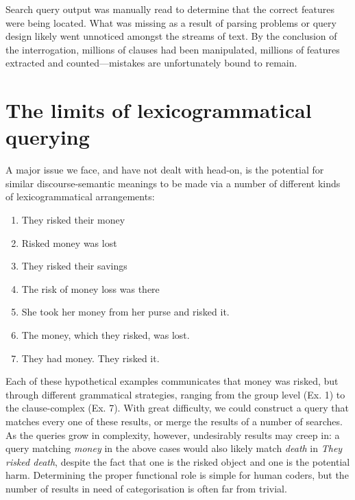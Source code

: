 	 Search query output was manually read to determine that the correct features were being located. What was missing as a result of parsing problems or query design likely went unnoticed amongst the streams of text. By the conclusion of the interrogation, millions of clauses had been manipulated, millions of features extracted and counted---mistakes are unfortunately bound to remain.

\section{The limits of lexicogrammatical querying}

        A major issue we face, and have not dealt with head-on, is the potential for similar discourse-semantic meanings to be made via a number of different kinds of lexicogrammatical arrangements:

        \begin{enumerate} [before=\itshape,font=\normalfont] \setlength\itemsep{0em} \small
            \item They risked their money
            \item Risked money was lost
            \item They risked their savings
            \item The risk of money loss was there
            \item She took her money from her purse and risked it.
            \item The money, which they risked, was lost.
            \item They had money. They risked it.
        \end{enumerate}
        Each of these hypothetical examples communicates that money was risked, but through different grammatical strategies, ranging from the group level (Ex. 1) to the clause-complex (Ex. 7). With great difficulty, we could construct a query that matches every one of these results, or merge the results of a number of searches. As the queries grow in complexity, however, undesirably results may creep in: a query matching \emph{money} in the above cases would also likely match \emph{death} in \emph{They risked death}, despite the fact that one is the risked object and one is the potential harm. Determining the proper functional role is simple for human coders, but the number of results in need of categorisation is often far from trivial. 



